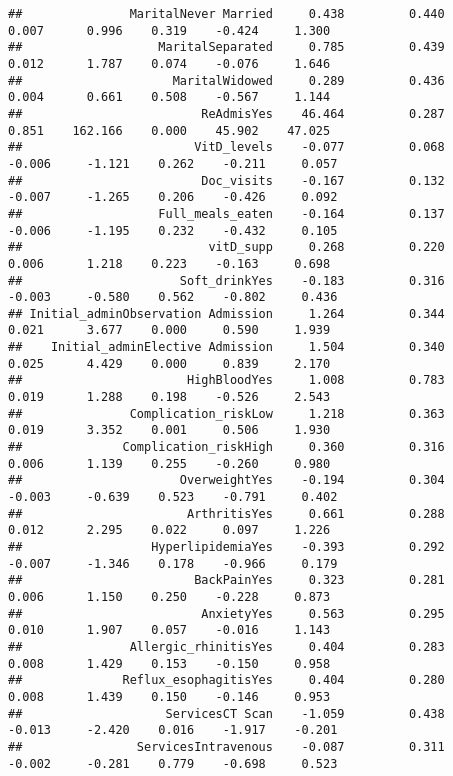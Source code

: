 \documentclass[
]{article}
\begin{document}
\begin{verbatim}
##               MaritalNever Married     0.438         0.440        0.007      0.996    0.319    -0.424     1.300 
##                   MaritalSeparated     0.785         0.439        0.012      1.787    0.074    -0.076     1.646 
##                     MaritalWidowed     0.289         0.436        0.004      0.661    0.508    -0.567     1.144 
##                         ReAdmisYes    46.464         0.287        0.851    162.166    0.000    45.902    47.025 
##                        VitD_levels    -0.077         0.068       -0.006     -1.121    0.262    -0.211     0.057 
##                         Doc_visits    -0.167         0.132       -0.007     -1.265    0.206    -0.426     0.092 
##                   Full_meals_eaten    -0.164         0.137       -0.006     -1.195    0.232    -0.432     0.105 
##                          vitD_supp     0.268         0.220        0.006      1.218    0.223    -0.163     0.698 
##                      Soft_drinkYes    -0.183         0.316       -0.003     -0.580    0.562    -0.802     0.436 
## Initial_adminObservation Admission     1.264         0.344        0.021      3.677    0.000     0.590     1.939 
##    Initial_adminElective Admission     1.504         0.340        0.025      4.429    0.000     0.839     2.170 
##                       HighBloodYes     1.008         0.783        0.019      1.288    0.198    -0.526     2.543 
##               Complication_riskLow     1.218         0.363        0.019      3.352    0.001     0.506     1.930 
##              Complication_riskHigh     0.360         0.316        0.006      1.139    0.255    -0.260     0.980 
##                      OverweightYes    -0.194         0.304       -0.003     -0.639    0.523    -0.791     0.402 
##                       ArthritisYes     0.661         0.288        0.012      2.295    0.022     0.097     1.226 
##                  HyperlipidemiaYes    -0.393         0.292       -0.007     -1.346    0.178    -0.966     0.179 
##                        BackPainYes     0.323         0.281        0.006      1.150    0.250    -0.228     0.873 
##                         AnxietyYes     0.563         0.295        0.010      1.907    0.057    -0.016     1.143 
##               Allergic_rhinitisYes     0.404         0.283        0.008      1.429    0.153    -0.150     0.958 
##              Reflux_esophagitisYes     0.404         0.280        0.008      1.439    0.150    -0.146     0.953 
##                    ServicesCT Scan    -1.059         0.438       -0.013     -2.420    0.016    -1.917    -0.201 
##                ServicesIntravenous    -0.087         0.311       -0.002     -0.281    0.779    -0.698     0.523 

\end{verbatim}
\end{document}
